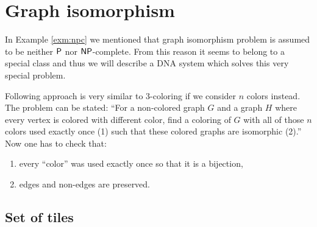 \section{Graph isomorphism}

In Example \ref{exm:npc} we mentioned that graph isomorphism problem is assumed to be neither $\P$ nor $\NP$-complete. From this reason it seems to belong to a special class and thus we will describe a DNA system which solves this very special problem. %

Following approach is very similar to 3-coloring if we consider $n$ colors instead. The problem can be stated: ``For a non-colored graph $G$ and a graph $H$ where every vertex is colored with different color, find a coloring of $G$ with all of those $n$ colors used exactly once (1) such that these colored graphs are isomorphic (2).'' Now one has to check that:
\begin{enumerate}
	\item every ``color'' was used exactly once so that it is a bijection,
	\item edges and non-edges are preserved.
\end{enumerate}


\subsection*{Set of tiles}

